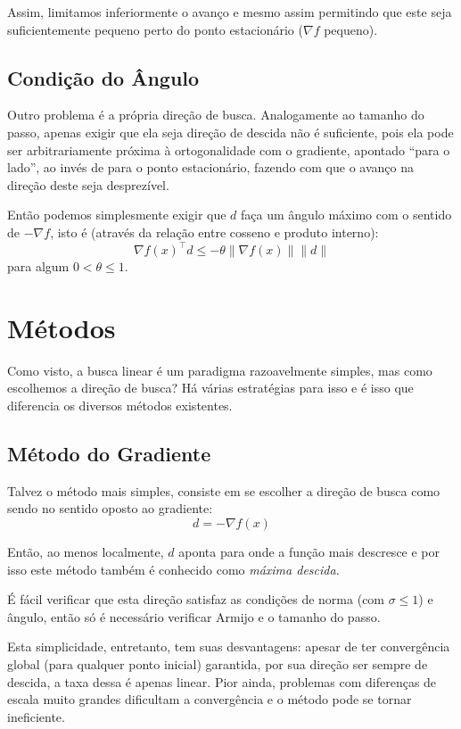 \documentclass[a4paper,11pt]{article}
\begin{document}
            Assim, limitamos inferiormente o avanço e mesmo assim permitindo que este seja suficientemente pequeno perto do ponto estacionário
            ($ \nabla f $ pequeno).

        \subsection*{Condição do Ângulo}
            Outro problema é a própria direção de busca. Analogamente ao tamanho do passo, apenas exigir que ela seja direção de descida não
            é suficiente, pois ela pode ser arbitrariamente próxima à ortogonalidade com o gradiente, apontado ``para o lado'', ao invés de
            para o ponto estacionário, fazendo com que o avanço na direção deste seja desprezível.

            Então podemos simplesmente exigir que $d$ faça um ângulo máximo com o sentido de $-\nabla f$, isto é (através da relação entre cosseno
            e produto interno):
                $$ \nabla f(x)^\top d \leq -\theta \|\nabla f(x)\| \|d\| $$
            para algum $0 < \theta \leq 1$.

    \newpage
    \section*{Métodos}
        Como visto, a busca linear é um paradigma razoavelmente simples, mas como escolhemos a direção de busca? Há várias estratégias para isso e é
        isso que diferencia os diversos métodos existentes.

        \subsection*{Método do Gradiente}
            Talvez o método mais simples, consiste em se escolher a direção de busca como sendo no sentido oposto ao gradiente:
                $$ d = -\nabla f(x) $$

            Então, ao menos localmente, $d$ aponta para onde a função mais descresce e por isso este método também é conhecido como \emph{máxima descida.}

            É fácil verificar que esta direção satisfaz as condições de norma (com $\sigma \leq 1$) e ângulo, então só é necessário verificar Armijo e o tamanho do passo.

            Esta simplicidade, entretanto, tem suas desvantagens: apesar de ter convergência global (para qualquer ponto inicial) garantida,
            por sua direção ser sempre de descida, a taxa dessa é apenas linear. Pior ainda, problemas com diferenças de escala muito grandes dificultam a convergência
            e o método pode se tornar ineficiente.
\end{document}
